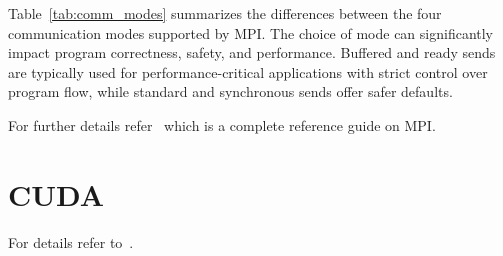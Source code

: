 \documentclass[12pt]{book}
\newcommand{\weblink}[2]{\href{#1}{\textcolor{blue}{#2}}}
\begin{document}
Table~\ref{tab:comm_modes} summarizes the differences between the four communication modes supported by MPI. The choice of mode can significantly impact program correctness, safety, and performance. Buffered and ready sends are typically used for performance-critical applications with strict control over program flow, while standard and synchronous sends offer safer defaults.

For further details refer~\cite{snir1998mpi} which is a complete reference guide on MPI.


\chapter{CUDA}

For details refer to~\cite{nvidia2011nvidia}.




\end{document}
